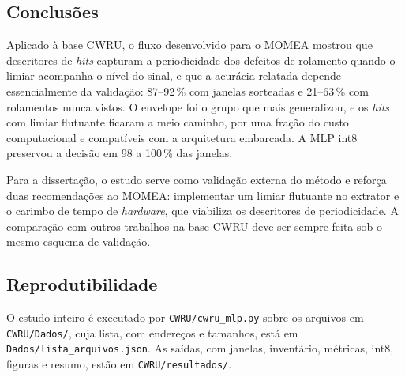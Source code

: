 \subsection{Conclusões}
\label{cwru:sec:conclusoes}

Aplicado à base CWRU, o fluxo desenvolvido para o MOMEA mostrou que descritores de \textit{hits} capturam a periodicidade dos defeitos de rolamento quando o limiar acompanha o nível do sinal, e que a acurácia relatada depende essencialmente da validação: 87--92\,\% com janelas sorteadas e 21--63\,\% com rolamentos nunca vistos. O envelope foi o grupo que mais generalizou, e os \textit{hits} com limiar flutuante ficaram a meio caminho, por uma fração do custo computacional e compatíveis com a arquitetura embarcada. A MLP int8 preservou a decisão em 98 a 100\,\% das janelas.

Para a dissertação, o estudo serve como validação externa do método e reforça duas recomendações ao MOMEA: implementar um limiar flutuante no extrator e o carimbo de tempo de \textit{hardware}, que viabiliza os descritores de periodicidade. A comparação com outros trabalhos na base CWRU deve ser sempre feita sob o mesmo esquema de validação.

\subsection*{Reprodutibilidade}

O estudo inteiro é executado por \texttt{CWRU/cwru\_mlp.py} sobre os arquivos em \texttt{CWRU/Dados/}, cuja lista, com endereços e tamanhos, está em \texttt{Dados/lista\_arquivos.json}. As saídas, com janelas, inventário, métricas, int8, figuras e resumo, estão em \texttt{CWRU/resultados/}.

